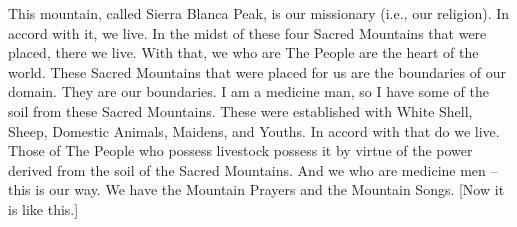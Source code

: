 This mountain, called Sierra Blanca Peak, is our missionary (i.e., our religion). In accord with it, we live. In the midst of these four Sacred Mountains that were placed, there we live. With that, we who are The People are the heart of the world. These Sacred Mountains that were placed for us are the boundaries of our domain. They are our boundaries. I am a medicine man, so I have some of the soil from these Sacred Mountains. These were established with White Shell, Sheep, Domestic Animals, Maidens, and Youths. In accord with that do we live. Those of The People who possess livestock possess it by virtue of the power derived from the soil of the Sacred Mountains. And we who are medicine men -- this is our way. We have the Mountain Prayers and the Mountain Songs. [Now it is like this.]